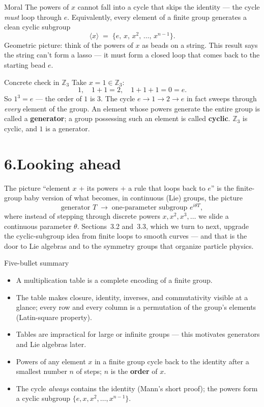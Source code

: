 \documentclass[11pt]{article}
\begin{document}
\begin{keybox}{Moral}
The powers of $x$ cannot fall into a cycle that skips the identity --- the
cycle \emph{must} loop through $e$. Equivalently, every element of a
finite group generates a clean cyclic subgroup
\[
  \langle x \rangle \;=\; \{e,\, x,\, x^2,\, \ldots,\, x^{n-1}\}.
\]
Geometric picture: think of the powers of $x$ as beads on a string. This
result says the string can't form a lasso --- it must form a closed loop
that comes back to the starting bead $e$.
\end{keybox}

\begin{examplebox}{Concrete check in $\mathbb{Z}_3$}
Take $x = 1 \in \mathbb{Z}_3$:
\[
  1, \quad 1+1 = 2, \quad 1+1+1 = 0 = e.
\]
So $1^3 = e$ --- the order of $1$ is $3$. The cycle
$e \to 1 \to 2 \to e$ in fact sweeps through \emph{every} element of the
group. An element whose powers generate the entire group is called a
\textbf{generator}; a group possessing such an element is called
\textbf{cyclic}. $\mathbb{Z}_3$ is cyclic, and $1$ is a generator.
\end{examplebox}

\section*{6.\quad Looking ahead}

The picture ``element $x$ + its powers + a rule that loops back to $e$''
is the finite-group baby version of what becomes, in continuous (Lie)
groups, the picture
\[
  \text{generator } T \;\longrightarrow\;
  \text{one-parameter subgroup } e^{i\theta T},
\]
where instead of stepping through discrete powers $x, x^2, x^3, \ldots$ we
slide a continuous parameter $\theta$. Sections~3.2 and~3.3, which we
turn to next, upgrade the cyclic-subgroup idea from finite loops to
smooth curves --- and that is the door to Lie algebras and to the
symmetry groups that organize particle physics.

\vspace{1em}
\begin{keybox}{Five-bullet summary}
\begin{itemize}[leftmargin=1.5em, itemsep=2pt]
  \item A multiplication table is a complete encoding of a finite group.
  \item The table makes closure, identity, inverses, and commutativity
    visible at a glance; every row and every column is a permutation of
    the group's elements (Latin-square property).
  \item Tables are impractical for large or infinite groups --- this
    motivates generators and Lie algebras later.
  \item Powers of any element $x$ in a finite group cycle back to the
    identity after a smallest number $n$ of steps; $n$ is the
    \textbf{order} of $x$.
  \item The cycle \emph{always} contains the identity (Mann's short
    proof); the powers form a cyclic subgroup
    $\{e, x, x^2, \ldots, x^{n-1}\}$.
\end{itemize}
\end{keybox}
\end{document}
